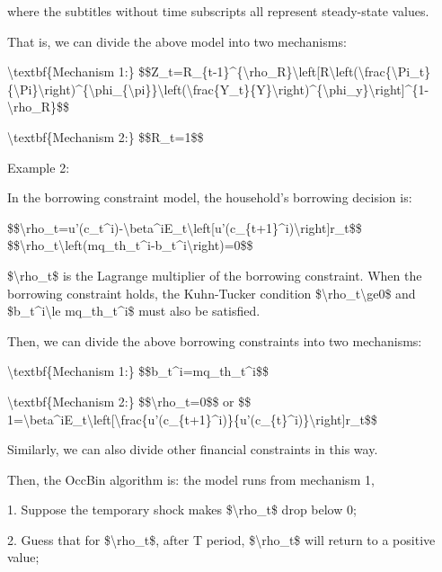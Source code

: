 \documentclass[10pt,math=newtx,citestyle=gb7714-2015,bibstyle=gb7714-2015]{elegantbook}
\begin{document}
	where the subtitles without time subscripts all represent steady-state values.
	
	That is, we can divide the above model into two mechanisms:
	
	\textbackslash{}textbf\{Mechanism 1:\}
	\$\$Z\_t=R\_\{t-1\}\^{}\{\textbackslash{}rho\_R\}\textbackslash{}left[R\textbackslash{}left(\textbackslash{}frac\{\textbackslash{}Pi\_t\}\{\textbackslash{}Pi\}\textbackslash{}right)\^{}\{\textbackslash{}phi\_\{\textbackslash{}pi\}\}\textbackslash{}left(\textbackslash{}frac\{Y\_t\}\{Y\}\textbackslash{}right)\^{}\{\textbackslash{}phi\_y\}\textbackslash{}right]\^{}\{1-\textbackslash{}rho\_R\}\$\$
	
	\textbackslash{}textbf\{Mechanism 2:\}
	\$\$R\_t=1\$\$
	
	Example 2:
	
	In the borrowing constraint model, the household's borrowing decision is:
	
	\$\$\textbackslash{}rho\_t=u'(c\_t\^{}i)-\textbackslash{}beta\^{}iE\_t\textbackslash{}left[u'(c\_\{t+1\}\^{}i)\textbackslash{}right]r\_t\$\$
	\$\$\textbackslash{}rho\_t\textbackslash{}left(mq\_th\_t\^{}i-b\_t\^{}i\textbackslash{}right)=0\$\$
	
	\$\textbackslash{}rho\_t\$ is the Lagrange multiplier of the borrowing constraint. When the borrowing constraint holds, the Kuhn-Tucker condition \$\textbackslash{}rho\_t\textbackslash{}ge0\$ and \$b\_t\^{}i\textbackslash{}le mq\_th\_t\^{}i\$ must also be satisfied.
	
	Then, we can divide the above borrowing constraints into two mechanisms:
	
	\textbackslash{}textbf\{Mechanism 1:\}
	\$\$b\_t\^{}i=mq\_th\_t\^{}i\$\$
	
	\textbackslash{}textbf\{Mechanism 2:\}
	\$\$\textbackslash{}rho\_t=0\$\$
	or
	\$\$ 1=\textbackslash{}beta\^{}iE\_t\textbackslash{}left[\textbackslash{}frac\{u'(c\_\{t+1\}\^{}i)\}\{u'(c\_\{t\}\^{}i)\}\textbackslash{}right]r\_t\$\$
	
	Similarly, we can also divide other financial constraints in this way.
	
	
	
	Then, the OccBin algorithm is: the model runs from mechanism 1,
	
	1. Suppose the temporary shock makes \$\textbackslash{}rho\_t\$ drop below 0;
	
	2. Guess that for \$\textbackslash{}rho\_t\$, after T period, \$\textbackslash{}rho\_t\$ will return to a positive value;
	
\end{document}
